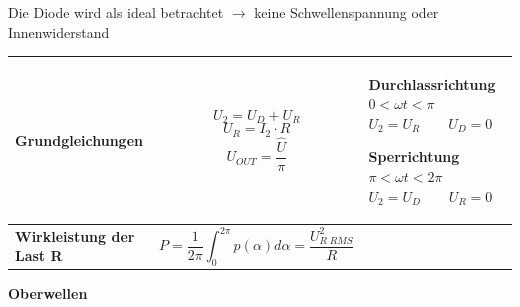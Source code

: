 \newline

\vspace{-0.3cm}
Die Diode wird als ideal betrachtet $ \rightarrow $ keine Schwellenspannung oder Innenwiderstand
	\renewcommand{\arraystretch}{1}
	\vspace{-0.2cm}
\begin{longtable}{| p{} | p{} | p{} |} 
    \hline
    \textbf{Grundgleichungen}&
    \vspace{-0.5cm}
    \[ U_2 = U_D + U_R \]
    \[ U_R = I_2 \cdot R\]
    \[ U_{OUT} = \dfrac{\widehat{U}}{\pi}\]\vspace{-1cm}&
    \textbf{Durchlassrichtung}\newline
    $ 0 < \omega t < \pi $\newline
    $U_2 = U_R \qquad U_D = 0$\newline

    \textbf{Sperrichtung}\newline
    $ \pi < \omega t < 2\pi $\newline
    $ U_2=U_D \qquad U_R = 0 $\newline
    \\
    \hline
    
    \textbf{Wirkleistung der Last R}&
    \vspace{-0.5cm}
    \[ P=\frac{1}{2\pi} \int_{0}^{2\pi} p(\alpha) d\alpha = \dfrac{U_{R\;RMS}^2}{R} \] \vspace{-0.5cm}&
    \\ \hline
\end{longtable}
%
\vspace{-0.3cm}
\textbf{Oberwellen}\\[0.2cm]
\vspace{-1cm}
